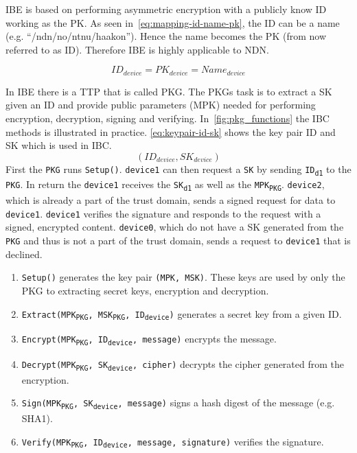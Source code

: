 \gls{IBE} is based on performing asymmetric encryption with a publicly know \gls{ID} working as the \gls{PK}.
As seen in~\autoref{eq:mapping-id-name-pk}, the \gls{ID} can be a \gls{name} (e.g. ``/ndn/no/ntnu/haakon'').
Hence the \gls{name} becomes the \gls{PK} (from now referred to as \gls{ID}).
Therefore \gls{IBE} is highly applicable to \gls{NDN}.

\begin{equation}\label{eq:mapping-id-name-pk}
ID_{device} = PK_{device} = Name_{device}
\end{equation}

In \gls{IBE} there is a \gls{TTP} that is called \gls{PKG}.
The \gls{PKG}s task is to extract a \gls{SK} given an \gls{ID} and provide public parameters (\gls{MPK}) needed for performing encryption, decryption, signing and verifying. In~\autoref{fig:pkg_functions} the \gls{IBC} methods is illustrated in practice. 
\autoref{eq:keypair-id-sk} shows the key pair \gls{ID} and \gls{SK} which is used in \gls{IBC}.
\begin{equation}\label{eq:keypair-id-sk}
(ID_{device}, SK_{device})
\end{equation}
First the \texttt{PKG} runs \texttt{Setup()}. 
\texttt{device1} can then request a \texttt{SK} by sending \texttt{ID\textsubscript{d1}} to the \texttt{PKG}. 
In return the \texttt{device1} receives the \texttt{SK\textsubscript{d1}} as well as the \texttt{MPK\textsubscript{PKG}}.
\texttt{device2}, which is already a part of the trust domain, sends a signed request for \gls{data} to \texttt{device1}. 
\texttt{device1} verifies the signature and responds to the request with a signed, encrypted content.
\texttt{device0}, which do not have a \gls{SK} generated from the \texttt{PKG} and thus is not a part of the trust domain, sends a request to \texttt{device1} that is declined.

\begin{enumerate}\label{ibc-methods}
  \item \texttt{Setup()} generates the key pair \texttt{(\gls{MPK}, \gls{MSK})}. 
  These keys are used by only the \gls{PKG} to extracting secret keys, encryption and decryption.
  \item \texttt{Extract(MPK\textsubscript{PKG}, MSK\textsubscript{PKG}, ID\textsubscript{device})} generates a secret key from a given ID. 
  \item \texttt{Encrypt(MPK\textsubscript{PKG}, ID\textsubscript{device}, message)} encrypts the message.
  \item \texttt{Decrypt(MPK\textsubscript{PKG}, SK\textsubscript{device}, cipher)} decrypts the cipher generated from the encryption.
  \item \texttt{Sign(MPK\textsubscript{PKG}, SK\textsubscript{device}, message)} signs a hash digest of the message (e.g. \gls{SHA1}).
  \item \texttt{Verify(MPK\textsubscript{PKG}, ID\textsubscript{device}, message, signature)} verifies the signature.
\end{enumerate}

